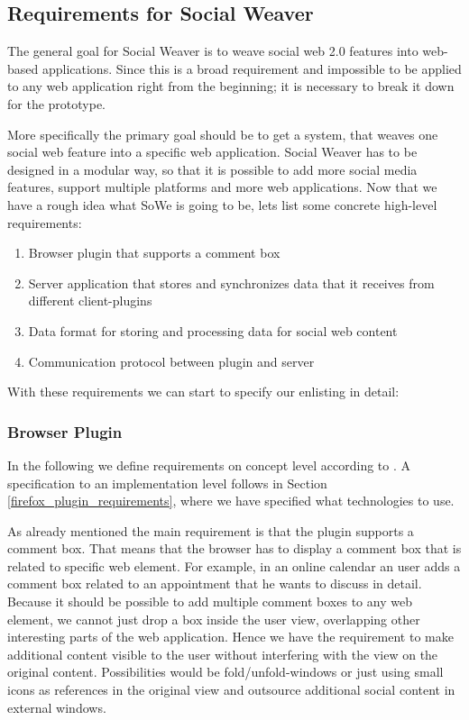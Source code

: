 \subsection{Requirements for Social Weaver}\label{sowe-reqs}

The general goal for Social Weaver is to weave social web 2.0 features into web-based applications. Since this is a broad requirement and impossible to be applied to any web application right from the beginning; it is necessary to break it down for the prototype.

More specifically the primary goal should be to get a system, that weaves one social web feature into a specific web application. Social Weaver has to be designed in a modular way, so that it is possible to add more social media features, support multiple platforms and more web applications. Now that we have a rough idea what SoWe is going to be, lets list some concrete high-level requirements:

\begin{enumerate}
\item Browser plugin that supports a comment box
\item Server application that stores and synchronizes data that it receives from different client-plugins
\item Data format for storing and processing data for social web content
\item Communication protocol between plugin and server
\end{enumerate}

With these requirements we can start to specify our enlisting in detail:

\subsubsection{Browser Plugin}\label{browser_plugin}
In the following we define requirements on concept level according to \cite{van2009requirements}. A specification to an implementation level follows in Section \ref{firefox_plugin_requirements}, where we have specified what technologies to use.

As already mentioned the main requirement is that the plugin supports a comment box. That means that the browser has to display a comment box that is related to specific web element. For example, in an online calendar an user adds a comment box related to an appointment that he wants to discuss in detail. 
Because it should be possible to add multiple comment boxes to any web element, we cannot just drop a box inside the user view, overlapping other interesting parts of the web application. Hence we have the requirement to make additional content visible to the user without interfering with the view on the original content. Possibilities would be fold/unfold-windows or just using small icons as references in the original view and outsource additional social content in external windows.


